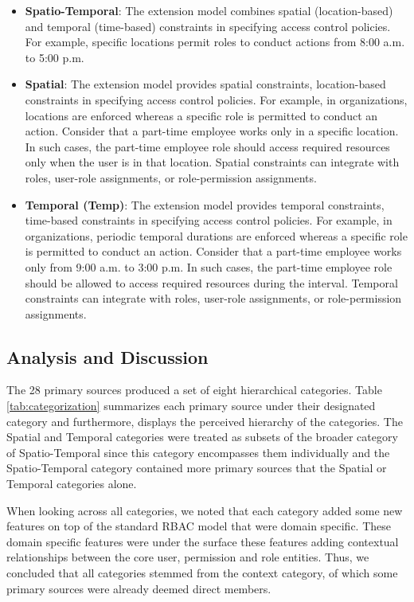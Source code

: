 \begin{itemize}
  \item \textbf{Spatio-Temporal}: The extension model combines spatial (location-based) and temporal (time-based) constraints in specifying access control policies. For example, specific locations permit roles to conduct actions from 8:00 a.m. to 5:00 p.m.

  \item \textbf{Spatial}: The extension model provides spatial constraints, location-based constraints in specifying access
	control policies. For example, in organizations, locations are enforced whereas a
	specific role is permitted to conduct an action. Consider that a part-time employee works only in a specific location.
	In such cases, the part-time employee role should access required resources only when the user is in that location. 
	Spatial constraints can integrate with roles, user-role assignments, or role-permission assignments. 

  \item \textbf{Temporal (Temp)}:  The extension model provides temporal constraints, time-based constraints in specifying access
	control policies. For example, in organizations, periodic temporal durations are enforced whereas a
	specific role is permitted to conduct an action. Consider that a part-time employee works only from 9:00 a.m. to 3:00 p.m.
	In such cases, the part-time employee role should be allowed to access required resources during the interval. 
	Temporal constraints can integrate with roles, user-role assignments, or role-permission assignments.   
	
\end{itemize}

\subsection{Analysis and Discussion}

The 28 primary sources produced a set of eight hierarchical categories. Table \ref{tab:categorization} summarizes each primary source under their designated
category and furthermore, displays the perceived hierarchy of the categories. 
The Spatial and Temporal categories were treated as subsets of the broader category of Spatio-Temporal since this category encompasses them individually and
the Spatio-Temporal category contained more primary sources that the Spatial or Temporal categories alone.  

When looking across all categories, we noted that each category added some new features on top of the standard RBAC model that were domain specific.
These domain specific features were under the surface these features adding contextual relationships between the core user, permission and role entities.  Thus, we
concluded that all categories stemmed from the context category, of which some primary sources were already deemed direct members.  

